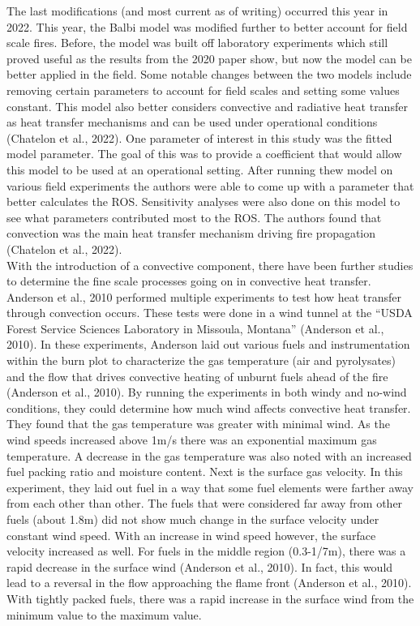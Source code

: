 \documentclass{article}
\begin{document}
\indent The last modifications (and most current as of writing) occurred this year in 2022. This year, the Balbi model was modified further to better account for field scale fires. Before, the model was built off laboratory experiments which still proved useful as the results from the 2020 paper show, but now the model can be better applied in the field. Some notable changes between the two models include removing certain parameters to account for field scales and setting some values constant. This model also better considers convective and radiative heat transfer as heat transfer mechanisms and can be used under operational conditions (Chatelon et al., 2022). One parameter of interest in this study was the fitted model parameter. The goal of this was to provide a coefficient that would allow this model to be used at an operational setting. After running thew model on various field experiments the authors were able to come up with a parameter that better calculates the ROS. Sensitivity analyses were also done on this model to see what parameters contributed most to the ROS. The authors found that convection was the main heat transfer mechanism driving fire propagation (Chatelon et al., 2022). \\
\indent With the introduction of a convective component, there have been further studies to determine the fine scale processes going on in convective heat transfer. Anderson et al., 2010 performed multiple experiments to test how heat transfer through convection occurs. These tests were done in a wind tunnel at the “USDA Forest Service Sciences Laboratory in Missoula, Montana” (Anderson et al., 2010). In these experiments, Anderson laid out various fuels and instrumentation within the burn plot to characterize the gas temperature (air and pyrolysates) and the flow that drives convective heating of unburnt fuels ahead of the fire (Anderson et al., 2010). By running the experiments in both windy and no-wind conditions, they could determine how much wind affects convective heat transfer. They found that the gas temperature was greater with minimal wind. As the wind speeds increased above 1m/s there was an exponential maximum gas temperature. A decrease in the gas temperature was also noted with an increased fuel packing ratio and moisture content. Next is the surface gas velocity. In this experiment, they laid out fuel in a way that some fuel elements were farther away from each other than other. The fuels that were considered far away from other fuels (about 1.8m) did not show much change in the surface velocity under constant wind speed. With an increase in wind speed however, the surface velocity increased as well. For fuels in the middle region (0.3-1/7m), there was a rapid decrease in the surface wind (Anderson et al., 2010). In fact, this would lead to a reversal in the flow approaching the flame front (Anderson et al., 2010). With tightly packed fuels, there was a rapid increase in the surface wind from the minimum value to the maximum value. \\
\end{document}

